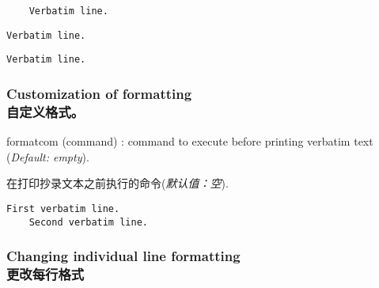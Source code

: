 \documentclass[twoside]{article}
\makeatletter
\providecommand\optname[1]{\textsf{#1}}
\newenvironment{optlist}{\begin{description}%
  \renewcommand\makelabel[1]{%
    \descriptionlabel{\mdseries\optname{##1}}}%
  \itemsep0.25\itemsep}%
 {\end{description}}
\def\thinskip{\hskip 0.16667em\relax}
\def\endash{--}
\def\emdash{\endash-}
\def\d@sh#1#2{\unskip#1\thinskip#2\thinskip\ignorespaces}
\def\Dash{\d@sh\nobreak\emdash}
\makeatother
\begin{document}

\begin{SideBySideExample}
  \begin{Verbatim}
    Verbatim line.
  \end{Verbatim}

  \begin{Verbatim}[gobble=2]
    Verbatim line.
  \end{Verbatim}

  \begin{Verbatim}[gobble=8]
    Verbatim line.
  \end{Verbatim}
\end{SideBySideExample}

\subsubsection{Customization of formatting\\自定义格式。}


\begin{optlist}
  \item[formatcom (command)]: command to execute before printing verbatim
  text
  (\emph{Default: empty}).

在打印抄录文本之前执行的命令(\emph{默认值：空}).
\end{optlist}


\begin{SideBySideExample}
  \begin{Verbatim}[formatcom=\color{red}]
    First verbatim line.
    Second verbatim line.
  \end{Verbatim}
\end{SideBySideExample}

\subsubsection{Changing individual line formatting\\更改每行格式}
\end{document}
